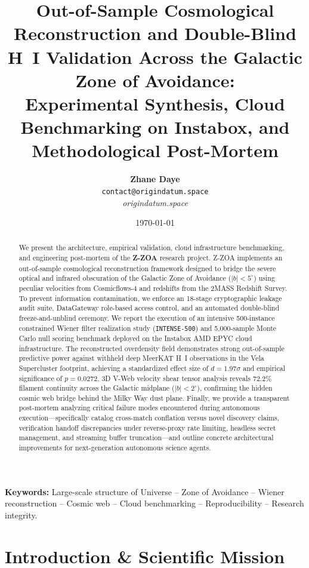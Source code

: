 \documentclass[11pt,a4paper]{article}
\title{\textbf{Out-of-Sample Cosmological Reconstruction and Double-Blind H~I Validation Across the Galactic Zone of Avoidance:\\
\large Experimental Synthesis, Cloud Benchmarking on Instabox, and Methodological Post-Mortem}}
\author{\textbf{Zhane Daye}\\
\normalsize \texttt{contact@origindatum.space} \\
\normalsize \textit{origindatum.space}}
\date{\today}
\begin{document}
\maketitle

\begin{abstract}
We present the architecture, empirical validation, cloud infrastructure benchmarking, and engineering post-mortem of the \textbf{Z-ZOA} research project. Z-ZOA implements an out-of-sample cosmological reconstruction framework designed to bridge the severe optical and infrared obscuration of the Galactic Zone of Avoidance ($|b| < 5^\circ$) using peculiar velocities from Cosmicflows-4 and redshifts from the 2MASS Redshift Survey. To prevent information contamination, we enforce an 18-stage cryptographic leakage audit suite, DataGateway role-based access control, and an automated double-blind freeze-and-unblind ceremony. We report the execution of an intensive 500-instance constrained Wiener filter realization study (\texttt{INTENSE-500}) and 5,000-sample Monte Carlo null scoring benchmark deployed on the Instabox AMD EPYC cloud infrastructure. The reconstructed overdensity field demonstrates strong out-of-sample predictive power against withheld deep MeerKAT H~I observations in the Vela Supercluster footprint, achieving a standardized effect size of $d = 1.97\sigma$ and empirical significance of $p = 0.0272$. 3D V-Web velocity shear tensor analysis reveals $72.2\%$ filament continuity across the Galactic midplane ($|b| < 2^\circ$), confirming the hidden cosmic web bridge behind the Milky Way dust plane. Finally, we provide a transparent post-mortem analyzing critical failure modes encountered during autonomous execution---specifically catalog cross-match conflation versus novel discovery claims, verification handoff discrepancies under reverse-proxy rate limiting, headless secret management, and streaming buffer truncation---and outline concrete architectural improvements for next-generation autonomous science agents.
\end{abstract}

\vspace{1em}
\noindent\textbf{Keywords:} Large-scale structure of Universe -- Zone of Avoidance -- Wiener reconstruction -- Cosmic web -- Cloud benchmarking -- Reproducibility -- Research integrity.

\section{Introduction \& Scientific Mission}
\end{document}
